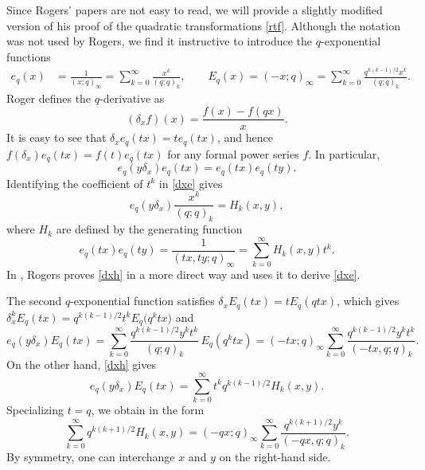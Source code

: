 \documentclass[pdftex]{sigma}
\numberwithin{equation}{section}
\begin{document}
Since Rogers' papers are not easy to read, we will provide a slightly modified
version of his proof of the quadratic transformations \eqref{rtf}.
Although the notation was not used by Rogers, we find it instructive to introduce the $q$-exponential functions
\begin{align*}
e_q(x)&=\frac 1{(x;q)_\infty}=\sum_{k=0}^\infty\frac{x^k}{(q;q)_k},\qquad
E_q(x)=(-x;q)_\infty=\sum_{k=0}^\infty\frac{q^{k(k-1)/2}x^k}{(q;q)_k}.
\end{align*}
Roger defines the $q$-derivative as
\begin{equation*}(\delta_x f)(x)=\frac{f(x)-f(qx)}{x}. \end{equation*}
It is easy to see that $\delta_x e_q(tx)=t e_q(tx)$,
 and hence $f(\delta_x)e_q(tx)=f(t)e_q(tx)$ for any formal power series $f$. In particular,
\begin{equation}\label{dxe}
e_q(y\delta_x)e_q(tx)=e_q(tx)e_q(ty).\end{equation}
Identifying the coefficient of $t^k$ in \eqref{dxe} gives
\begin{equation}\label{dxh}e_q(y\delta_x)\frac{x^k}{(q;q)_k}=H_k(x,y),\end{equation}
where $H_k$ are defined by the generating function
\begin{equation}\label{eeh}e_q(tx)e_q(ty)= \frac 1{(tx,ty;q)_\infty}=\sum_{k=0}^\infty H_k(x,y)t^k.\end{equation}
In \cite{r1}, Rogers proves \eqref{dxh} in a more direct way and uses it to derive \eqref{dxe}.

The second $q$-exponential function satisfies $\delta_x E_q(tx)=t E_q(qtx)$,
which gives $\delta_x^k E_q(tx)=q^{k(k-1)/2}t^kE_q\bigl(q^ktx\bigr)$ and
\begin{equation*} e_q(y\delta_x)E_q(tx)=\sum_{k=0}^\infty\frac{q^{k(k-1)/2}y^kt^k}{(q;q)_k}\,E_q(q^ktx)
=(-tx;q)_\infty\sum_{k=0}^\infty\frac{q^{k(k-1)/2}y^kt^k}{(-tx,q;q)_k}.\end{equation*}
On the other hand, \eqref{dxh} gives
\begin{equation*}e_q(y\delta_x)E_q(tx)=\sum_{k=0}^\infty t^kq^{k(k-1)/2} H_k(x,y). \end{equation*}
Specializing $t=q$, we obtain \cite[Section~6, equation~(1)]{r2} in the form
\begin{equation}\label{rhi}\sum_{k=0}^\infty q^{k(k+1)/2} H_k(x,y)=(-qx;q)_\infty\sum_{k=0}^\infty\frac{q^{k(k+1)/2}y^k}{(-qx,q;q)_k}.
\end{equation}
By symmetry, one can interchange $x$ and $y$ on the right-hand side.
\end{document}
